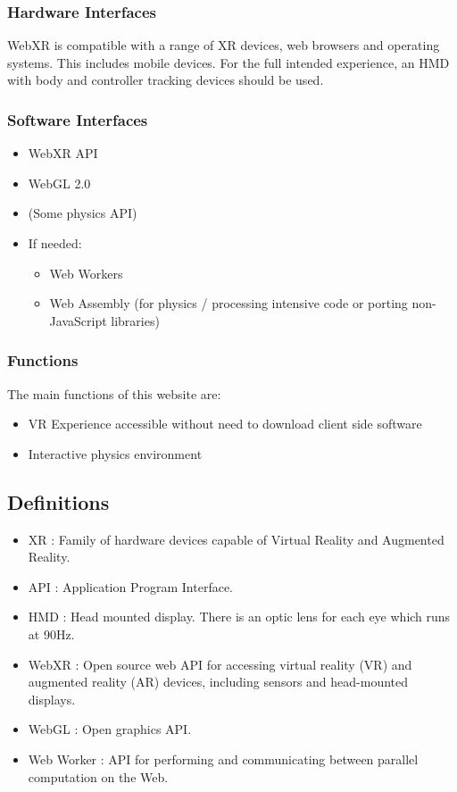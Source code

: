 \subsubsection{Hardware Interfaces}
WebXR is compatible with a range of XR devices, web browsers and operating systems. This includes mobile devices. For the full intended experience, an HMD with body and controller tracking devices should be used.

\subsubsection{Software Interfaces}
\begin{itemize}
    \item WebXR API
    \item WebGL 2.0
    \item (Some physics API)
    \item If needed:
    \begin{itemize}
        \item Web Workers
        \item Web Assembly (for physics / processing intensive code or porting non-JavaScript libraries)
    \end{itemize}
\end{itemize}

\subsubsection{Functions}
The main functions of this website are:
\begin{itemize}
    \item VR Experience accessible without need to download client side software 
    \item Interactive physics environment
\end{itemize}
\subsection{Definitions}
\begin{itemize}
    \item XR : Family of hardware devices capable of Virtual Reality and Augmented Reality.
    \item API : Application Program Interface.
    \item HMD : Head mounted display. There is an optic lens for each eye which runs at 90Hz.
    \item WebXR : Open source web API for accessing virtual reality (VR) and augmented reality (AR) devices, including sensors and head-mounted displays.
    \item WebGL : Open graphics API.
    \item Web Worker : API for performing and communicating between parallel computation on the Web.
\end{itemize}